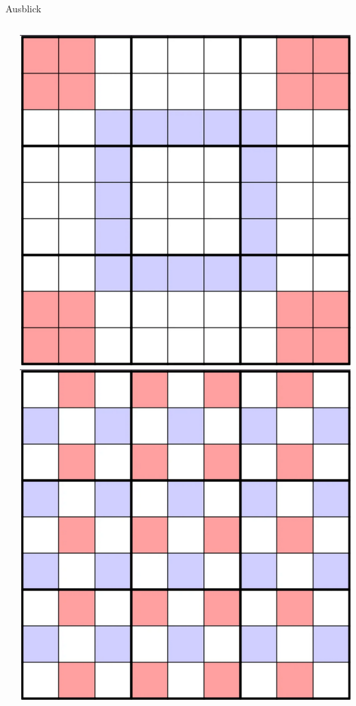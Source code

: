 \begin{frame}{Ausblick}
\begin{columns}[T]
\begin{column}{0.3\textwidth}
        \end{column}
        \begin{column}{0.3\textwidth}
            \vspace*{0.5cm}
            \includegraphics[width=\textwidth]{Pictures/H1.png} \\
            \vspace*{0.5cm}
            \includegraphics[width=\textwidth]{Pictures/H4.png}

\end{column}
\end{columns}
\end{frame}
